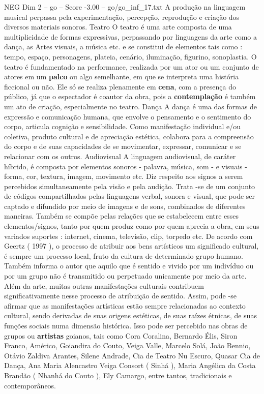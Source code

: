 \begin{textsample}{NEG Dim 2 – go – Score -3.00 – go/go\_inf\_17.txt}
A produção na linguagem musical perpassa pela experimentação, percepção, reprodução e criação dos diversos materiais sonoros.
Teatro O teatro é uma arte composta de uma multiplicidade de formas expressivas, perpassando por linguagens da arte como a dança, as Artes visuais, a música etc. e se constitui de elementos tais como : tempo, espaço, personagens, plateia, cenário, iluminação, figurino, sonoplastia.
O teatro é fundamentado na performance, realizada por um ator ou um conjunto de atores em um \textbf{palco} ou algo semelhante, em que se interpreta uma história ficcional ou não.
Ele só se realiza plenamente em \textbf{cena}, com a presença do público, já que o espectador é coautor da obra, pois a \textbf{contemplação} é também um ato de criação, especialmente no teatro.
Dança A dança é uma das formas de expressão e comunicação humana, que envolve o pensamento e o sentimento do corpo, articula cognição e sensibilidade.
Como manifestação individual e/ou coletiva, produto cultural e de apreciação estética, colabora para a compreensão do corpo e de suas capacidades de se movimentar, expressar, comunicar e se relacionar com os outros.
Audiovisual A linguagem audiovisual, de caráter híbrido, é composta por elementos sonoros - palavra, música, som - e visuais - forma, cor, textura, imagem, movimento etc.
Diz respeito aos signos a serem percebidos simultaneamente pela visão e pela audição.
Trata -se de um conjunto de códigos compartilhados pelas linguagens verbal, sonora e visual, que pode ser captado e difundido por meio de imagens e de sons, combinados de diferentes maneiras.
Também se compõe pelas relações que se estabelecem entre esses elementos/signos, tanto por quem produz como por quem aprecia a obra, em seus variados suportes : internet, cinema, televisão, clip, torpedo etc.
De acordo com Geertz ( 1997 ), o processo de atribuir aos bens artísticos um significado cultural, é sempre um processo local, fruto da cultura de determinado grupo humano.
Também informa o autor que aquilo que é sentido e vivido por um indivíduo ou por um grupo não é transmitido ou perpetuado unicamente por meio da arte.
Além da arte, muitas outras manifestações culturais contribuem significativamente nesse processo de atribuição de sentido.
Assim, pode -se afirmar que as manifestações artísticas estão sempre relacionadas ao contexto cultural, sendo derivadas de suas origens estéticas, de suas raízes étnicas, de suas funções sociais numa dimensão histórica.
Isso pode ser percebido nas obras de grupos ou \textbf{artistas} goianos, tais como Cora Coralina, Bernardo Élis, Siron Franco, Américo, Goiandira do Couto, Veiga Valle, Marcelo Solá, João Bennio, Otávio Zaldiva Arantes, Silene Andrade, Cia de Teatro Nu Escuro, Quasar Cia de Dança, Ana Maria Alencastro Veiga Consort ( Sinhá ), Maria Angélica da Costa Brandão ( Nhanhá do Couto ), Ely Camargo, entre tantos, tradicionais e contemporâneos.

\end{textsample}
